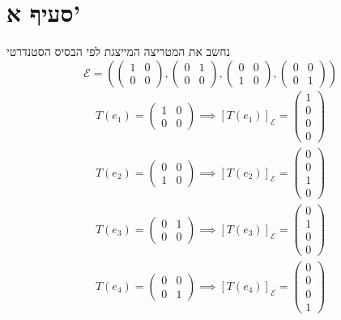 \documentclass[12pt, titlepage]{article}
\begin{document}
\section*{סעיף א'}
נחשב את המטריצה המייצגת
לפי הבסיס הסטנדרטי 
\[
    \mathcal{E}=\left(\begin{pmatrix}
        1 & 0 \\ 0 & 0
\end{pmatrix},\begin{pmatrix}
        0 & 1 \\ 0 & 0
\end{pmatrix},\begin{pmatrix}
        0 & 0 \\ 1 & 0
\end{pmatrix},\begin{pmatrix}
        0 & 0 \\ 0 & 1
\end{pmatrix}\right)
\]
\begin{gather*}
    T\left(
e_1\right) = \begin{pmatrix}
        1 & 0 \\ 0 & 0
    \end{pmatrix} \implies \left[T\left(e_1\right)\right]_\mathcal{E} = \begin{pmatrix}
        1\\0\\0\\0  \end{pmatrix} \\
     T\left(
e_2\right) = \begin{pmatrix}
        0 & 0 \\ 1 & 0
    \end{pmatrix} \implies \left[T\left(e_2\right)\right]_\mathcal{E} = \begin{pmatrix}
        0\\0\\1\\0
    \end{pmatrix} \\ 
 T\left(
e_3\right) = \begin{pmatrix}
        0 & 1 \\ 0 & 0
    \end{pmatrix} \implies \left[T\left(e_3\right)\right]_\mathcal{E} = \begin{pmatrix}
        0\\1\\0\\0
    \end{pmatrix} \\ 
 T\left(
e_4\right) = \begin{pmatrix}
        0 & 0 \\ 0 & 1
    \end{pmatrix} \implies \left[T\left(e_4\right)\right]_\mathcal{E} = \begin{pmatrix}
        0\\0\\0\\1
    \end{pmatrix} \\ 
\end{gather*}
\end{document}
